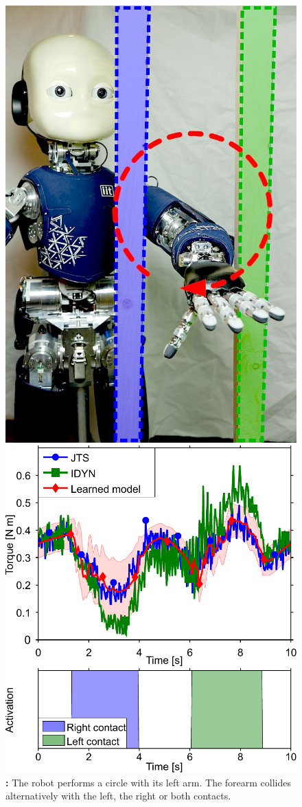 	\begin{figure}[t]
		\begin{minipage}{.32\linewidth}
			\centering
			\includegraphics[width =.79\linewidth]{robertoICRA/fig/iCubParis02_Double_Contact}
			\caption{\textbf{:} The robot performs a circle with its left arm. 
			The forearm collides alternatively with the left, the right or both contacts.}
			\label{fig:exp3:icuparis_experiment_bars}
		\end{minipage}	
		\hfill
		\begin{minipage}{.52\linewidth}
			\centering
			\includegraphics[width=.79\linewidth]{robertoICRA/fig/exp3_both}

\end{minipage}
\end{figure}
